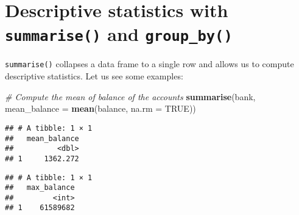 \documentclass[]{book}
\newenvironment{Shaded}{\begin{snugshade}}{\end{snugshade}}
\newcommand{\KeywordTok}[1]{\textcolor[rgb]{0.13,0.29,0.53}{\textbf{{#1}}}}
\newcommand{\DataTypeTok}[1]{\textcolor[rgb]{0.13,0.29,0.53}{{#1}}}
\newcommand{\StringTok}[1]{\textcolor[rgb]{0.31,0.60,0.02}{{#1}}}
\newcommand{\CommentTok}[1]{\textcolor[rgb]{0.56,0.35,0.01}{\textit{{#1}}}}
\newcommand{\OtherTok}[1]{\textcolor[rgb]{0.56,0.35,0.01}{{#1}}}
\newcommand{\NormalTok}[1]{{#1}}
\begin{document}
\section{\texorpdfstring{Descriptive statistics with
\texttt{summarise()} and
\texttt{group\_by()}}{Descriptive statistics with summarise() and group\_by()}}\label{descriptive-statistics-with-summarise-and-group_by}

\texttt{summarise()} collapses a data frame to a single row and allows
us to compute descriptive statistics. Let us see some examples:

\begin{Shaded}
\begin{Highlighting}[]
\CommentTok{# Compute the mean of balance of the accounts}
\KeywordTok{summarise}\NormalTok{(bank, }\DataTypeTok{mean_balance =} \KeywordTok{mean}\NormalTok{(balance, }\DataTypeTok{na.rm =} \OtherTok{TRUE}\NormalTok{))}
\end{Highlighting}
\end{Shaded}

\begin{verbatim}
## # A tibble: 1 × 1
##   mean_balance
##          <dbl>
## 1     1362.272
\end{verbatim}

\begin{Shaded}
\end{Shaded}

\begin{verbatim}
## # A tibble: 1 × 1
##   max_balance
##         <int>
## 1    61589682
\end{verbatim}

\begin{Shaded}
\end{Shaded}
\end{document}
